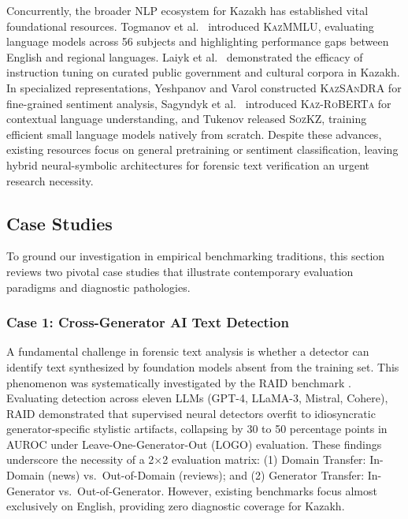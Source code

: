 Concurrently, the broader NLP ecosystem for Kazakh has established vital foundational resources. Togmanov et al.\ \cite{togmanov-etal-2025-kazmmlu} introduced \textsc{KazMMLU}, evaluating language models across 56 subjects and highlighting performance gaps between English and regional languages. Laiyk et al.\ \cite{laiyk-etal-2025-instruction} demonstrated the efficacy of instruction tuning on curated public government and cultural corpora in Kazakh. In specialized representations, Yeshpanov and Varol \cite{yeshpanov2024kazsandra} constructed \textsc{KazSAnDRA} for fine-grained sentiment analysis, Sagyndyk et al.\ \cite{sagyndyk2025kazroberta} introduced \textsc{Kaz-RoBERTa} for contextual language understanding, and Tukenov \cite{tukenov2026sozkz} released \textsc{SozKZ}, training efficient small language models natively from scratch. Despite these advances, existing resources focus on general pretraining or sentiment classification, leaving hybrid neural-symbolic architectures for forensic text verification an urgent research necessity.

\subsection{Case Studies}
\label{sec:case_studies}

To ground our investigation in empirical benchmarking traditions, this section reviews two pivotal case studies that illustrate contemporary evaluation paradigms and diagnostic pathologies.

\subsubsection{Case 1: Cross-Generator AI Text Detection}
\label{sec:case1_cross_generator}

A fundamental challenge in forensic text analysis is whether a detector can identify text synthesized by foundation models absent from the training set. This phenomenon was systematically investigated by the \textsc{RAID} benchmark \cite{wang2024raid}. Evaluating detection across eleven LLMs (GPT-4, LLaMA-3, Mistral, Cohere), RAID demonstrated that supervised neural detectors overfit to idiosyncratic generator-specific stylistic artifacts, collapsing by 30 to 50 percentage points in AUROC under Leave-One-Generator-Out (LOGO) evaluation. These findings underscore the necessity of a 2$\times$2 evaluation matrix: (1) Domain Transfer: In-Domain (news) vs.\ Out-of-Domain (reviews); and (2) Generator Transfer: In-Generator vs.\ Out-of-Generator. However, existing benchmarks focus almost exclusively on English, providing zero diagnostic coverage for Kazakh.

